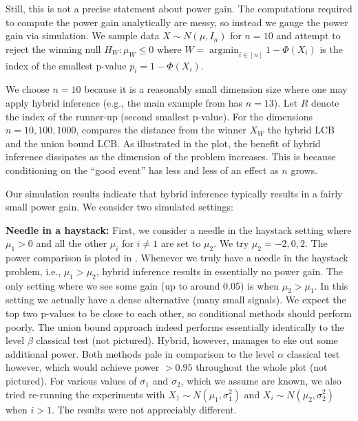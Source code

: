 \documentclass{article}
\DeclareMathOperator*{\argmin}{argmin}
\begin{document}
\begin{appendix}
Still, this is not a precise statement about power gain. The computations required to compute the power gain analytically are messy, so instead we gauge the power gain via simulation. We sample data $X \sim N(\mu, I_n)$ for $n=10$ and attempt to reject the winning null $H_W: \mu_W \leq 0$ where $W = \argmin_{i \in [n]} 1 - \Phi(X_i)$ is the index of the smallest p-value $p_i = 1-\Phi(X_i)$.  

We choose $n=10$ because it is a reasonably small dimension size where one may apply hybrid inference (e.g., the main example from \cite{Andrews2023} has $n=13$). Let $R$ denote the index of the runner-up (second smallest p-value). For the dimensions  $n=10, 100, 1000$,  
compares the distance from the winner $X_W$ the hybrid LCB and the union bound LCB. As illustrated in the plot, the benefit of hybrid inference dissipates as the dimension of the problem increases. This is because conditioning on the ``good event'' has less and less of an effect as $n$ grows. 

Our simulation results indicate that hybrid inference typically results in a fairly small power gain. We consider two simulated settings: \newline 

\noindent \textbf{Needle in a haystack: } First, we consider a needle in the haystack setting where $\mu_1 > 0$ and all the other $\mu_i$ for $ i\neq 1$ are set to $\mu_2$. We try $\mu_2 = -2, 0, 2$. The power comparison is ploted in . Whenever we truly have a needle in the haystack problem, i.e., $\mu_1 > \mu_2$, hybrid inference results in essentially no power gain. The only setting where we see some gain (up to around $0.05$) is when $\mu_2 > \mu_1$. In this setting  we actually have a dense alternative (many small signals). We expect the top two p-values to be close to each other, so conditional methods should perform poorly. The union bound approach indeed performs essentially identically to the level $\beta$ classical test (not pictured). Hybrid, however, manages to eke out some additional power. Both methods pale in comparison to the level $\alpha$ classical test however, which would achieve power $>0.95$ throughout the whole plot (not pictured). For various values of $\sigma_1$ and $\sigma_2$, which we assume are known, we also tried re-running the experiments with  $X_1 \sim N(\mu_1, \sigma_1^2)$ and $X_i \sim N(\mu_2, \sigma_2^2)$ when $i > 1$. The results were not appreciably different.  \newline 


\end{appendix}
\end{document}
